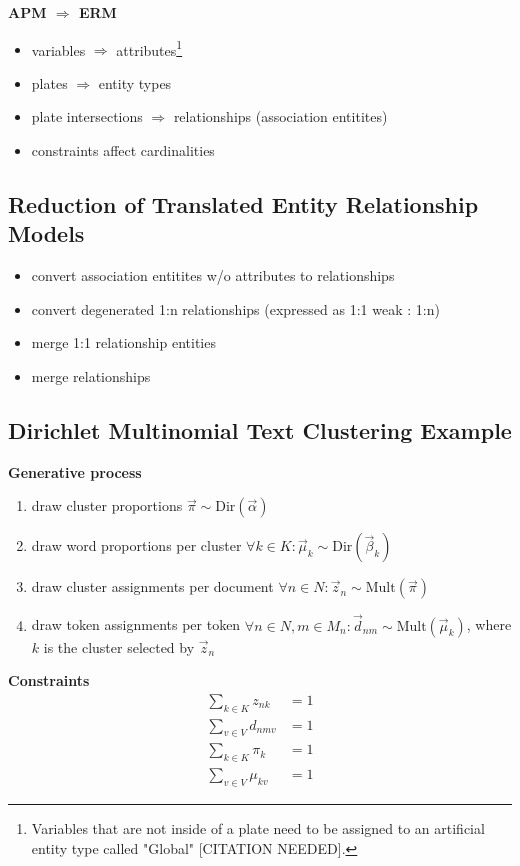 \textbf{APM $\Rightarrow$ ERM}
\begin{itemize}
\item variables $\Rightarrow$ attributes\footnote{Variables that are not inside of a plate need to be assigned to an artificial entity type called "Global" [CITATION NEEDED].}
\item plates $\Rightarrow$ entity types
\item plate intersections $\Rightarrow$ relationships (association entitites)
\item constraints affect cardinalities
\end{itemize}

\subsection{Reduction of Translated Entity Relationship Models}

\textbf{}
\begin{itemize}
\item convert association entitites w/o attributes to relationships
\item convert degenerated 1:n relationships (expressed as 1:1 weak : 1:n)
\item merge 1:1 relationship entities
\item merge relationships
\end{itemize}

\subsection{Dirichlet Multinomial Text Clustering Example}

\textbf{Generative process}
\begin{enumerate}
\item draw cluster proportions $\vec \pi \sim \text{Dir}(\vec \alpha)$
\item draw word proportions per cluster $\forall k \in K: \vec \mu_k \sim \text{Dir}(\vec \beta_k)$
\item draw cluster assignments per document $\forall n \in N: \vec z_n \sim \text{Mult}(\vec \pi)$
\item draw token assignments per token $\forall n \in N, m \in M_n: \vec d_{nm} \sim \text{Mult}(\vec \mu_k)$, where $k$ is the cluster selected by $\vec z_n$
\end{enumerate}

\textbf{Constraints}
\begin{align}
\sum_{k \in K} z_{nk} &= 1\\
\sum_{v \in V} d_{nmv} &= 1\\
\sum_{k \in K} \pi_{k} &= 1\\
\sum_{v \in V} \mu_{kv} &= 1
\end{align}

